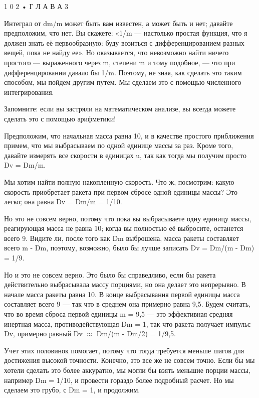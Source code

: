 \documentclass[10pt,oneside]{article}
\newcommand{\TipsSubsection}[1]{\par\vspace{6bp}{\normalsize\bfseries #1\par}\vspace{2bp}}
\begin{document}
1 0 2 • Г Л А В А  3\par

Интеграл от dm/m может быть вам известен, а может быть и нет; давайте предположим, что нет. Вы скажете: «1/m --- настолько простая функция, что я должен знать её первообразную: буду возиться с дифференцированием разных вещей, пока не найду ее». Но оказывается, что невозможно найти ничего простого --- выраженного через m, степени m и тому подобное, --- что при дифференцировании давало бы 1/m. Поэтому, не зная, как сделать это таким способом, мы пойдем другим путем. Мы сделаем это с помощью численного интегрирования.\par

Запомните: если вы застряли на математическом анализе, вы всегда можете сделать это с помощью арифметики!\par

\TipsSubsection{3-4 Численное интегрирование}

Предположим, что начальная масса равна 10, и в качестве простого приближения примем, что мы выбрасываем по одной единице массы за раз. Кроме того, давайте измерять все скорости в единицах u, так как тогда мы получим просто Dv = Dm/m.\par

Мы хотим найти полную накопленную скорость. Что ж, посмотрим: какую скорость приобретает ракета при первом сбросе одной единицы массы? Это легко; она равна Dv = Dm/m = 1/10.\par

Но это не совсем верно, потому что пока вы выбрасываете одну единицу массы, реагирующая масса не равна 10; когда вы полностью её выбросите, останется всего 9. Видите ли, после того как Dm выброшена, масса ракеты составляет всего m - Dm, поэтому, возможно, было бы лучше записать Dv = Dm/(m - Dm) = 1/9.\par

Но и это не совсем верно. Это было бы справедливо, если бы ракета действительно выбрасывала массу порциями, но она делает это непрерывно. В начале масса ракеты равна 10. В конце выбрасывания первой единицы масса составляет всего 9 --- так что в среднем она примерно равна 9,5. Будем считать, что во время сброса первой единицы m = 9,5 --- это эффективная средняя инертная масса, противодействующая Dm = 1, так что ракета получает импульс Dv, примерно равный Dv \(\approx\) Dm/(m - Dm/2) = 1/9,5.\par

Учет этих половинок помогает, потому что тогда требуется меньше шагов для достижения высокой точности. Конечно, это все же не совсем точно. Если бы мы хотели сделать это более аккуратно, мы могли бы взять меньшие порции массы, например Dm = 1/10, и провести гораздо более подробный расчет. Но мы сделаем это грубо, с Dm = 1, и продолжим.\par
\end{document}
